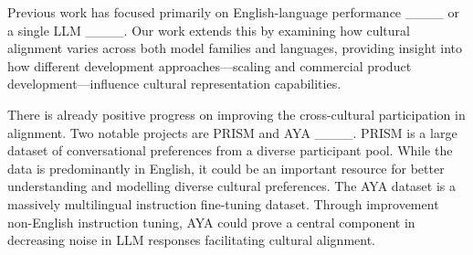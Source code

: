Previous work has focused primarily on English-language performance ____ or a single LLM ____. Our work extends this by examining how cultural alignment varies across both model families and languages, providing insight into how different development approaches---scaling and commercial product development---influence cultural representation capabilities.

There is already positive progress on improving the cross-cultural participation in alignment. Two notable projects are PRISM and AYA ____. PRISM is a large dataset of conversational preferences from a diverse participant pool. While the data is predominantly in English, it could be an important resource for better understanding and modelling diverse cultural preferences. The AYA dataset is a massively multilingual instruction fine-tuning dataset. Through improvement non-English instruction tuning, AYA could prove a central component in decreasing noise in LLM responses facilitating cultural alignment.